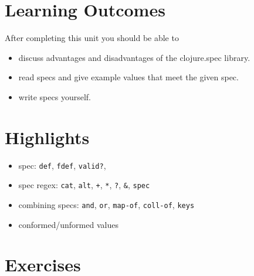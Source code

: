 \documentclass[11pt,a4paper]{article}
\begin{document}
\section{Learning Outcomes}

After completing this unit you should be able to

\begin{itemize}
    \item discuss advantages and disadvantages of the clojure.spec library.
    \item read specs and give example values that meet the given spec.
    \item write specs yourself.
\end{itemize}

\section{Highlights}

\begin{itemize}
    \item spec: \verb|def|, \verb|fdef|, \verb|valid?|,
    \item spec regex: \verb|cat|, \verb|alt|, \verb|+|, \verb|*|, \verb|?|, \verb|&|, \verb|spec|
    \item combining specs: \verb|and|, \verb|or|, \verb|map-of|, \verb|coll-of|, \verb|keys|
    \item conformed/unformed values
\end{itemize}



\section{Exercises}
\end{document}
